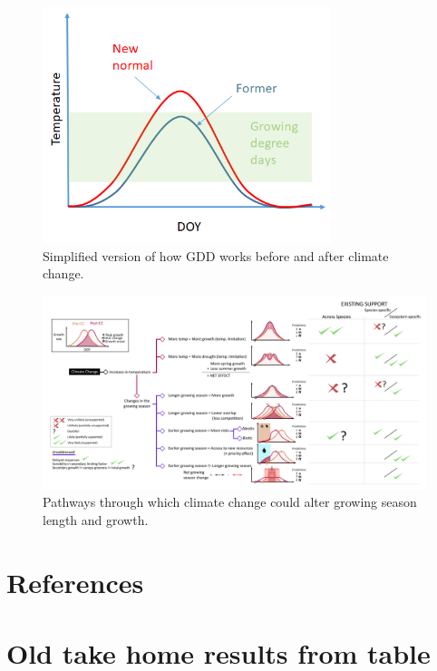 \documentclass[11pt]{article}
\begin{document}
\begin{figure}[h!]
\includegraphics[width=0.75\textwidth]{..//figures/simpletempcurve_fromlucidboard.png}
\caption{Simplified version of how GDD works before and after climate change.}
\label{fig:simpletemp}
\end{figure}




\begin{figure}[h!]
\includegraphics[width=1\textwidth]{..//figures/some conceptual figure2.0.png}
\caption{Pathways through which climate change could alter growing season length and growth.}
\label{fig:pathways}
\end{figure}


\clearpage
\section{References}



\clearpage

\section{Old take home results from table}
\end{document}
